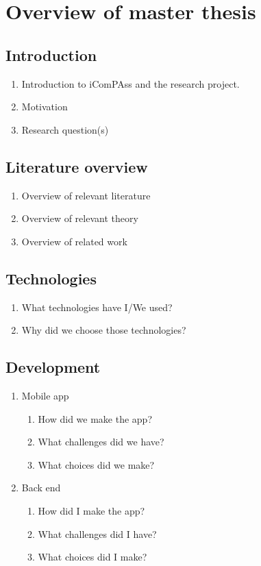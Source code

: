 \documentclass[../Main/thesis.tex]{subfiles}
\begin{document}
\chapter*{Overview of master thesis}

\section*{Introduction}
\begin{enumerate}
	\item Introduction to iComPAss and the research project.
	\item Motivation
	\item Research question(s)
\end{enumerate}

\section*{Literature overview}
\begin{enumerate}
	\item Overview of relevant literature
	\item Overview of relevant theory
	\item Overview of related work
\end{enumerate}

\section*{Technologies}
\begin{enumerate}
	\item What technologies have I/We used?
	\item Why did we choose those technologies?
\end{enumerate}
	
\section*{Development}
\begin{enumerate}
	\item Mobile app
	\begin{enumerate}
		\item How did we make the app?
		\item What challenges did we have?
		\item What choices did we make?
	\end{enumerate}

	\item Back end
	\begin{enumerate}
		\item How did I make the app?
		\item What challenges did I have?
		\item What choices did I make?
	\end{enumerate}
\end{enumerate}
\end{document}
